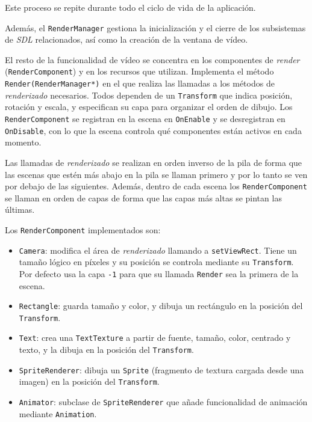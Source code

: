 Este proceso se repite durante todo el ciclo de vida de la aplicación.

\medskip

Además, el \texttt{RenderManager} gestiona la inicialización y el cierre de los subsistemas de \textit{SDL} relacionados, así como la creación de la ventana de vídeo.

\medskip

El resto de la funcionalidad de vídeo se concentra en los componentes de \textit{render} (\texttt{RenderComponent}) y en los recursos que utilizan. Implementa el método \texttt{Render(RenderManager*)} en el que realiza las llamadas a los métodos de \textit{renderizado} necesarios. Todos dependen de un \texttt{Transform} que indica posición, rotación y escala, y especifican su capa para organizar el orden de dibujo. Los \texttt{RenderComponent} se registran en la escena en \texttt{OnEnable} y se desregistran en \texttt{OnDisable}, con lo que la escena controla qué componentes están activos en cada momento.  

\medskip

Las llamadas de \textit{renderizado} se realizan en orden inverso de la pila de forma que las escenas que estén más abajo en la pila se llaman primero y por lo tanto se ven por debajo de las siguientes. Además, dentro de cada escena los \texttt{RenderComponent} se llaman en orden de capas de forma que las capas más altas se pintan las últimas.

\medskip

Los \texttt{RenderComponent} implementados son: 

\begin{itemize}
	\item \texttt{Camera}: modifica el área de \textit{renderizado} llamando a \texttt{setViewRect}. Tiene un tamaño lógico en píxeles y su posición se controla mediante su \texttt{Transform}. Por defecto usa la capa \texttt{-1} para que su llamada \texttt{Render} sea la primera de la escena.
	\item \texttt{Rectangle}: guarda tamaño y color, y dibuja un rectángulo en la posición del \texttt{Transform}. 
	\item \texttt{Text}: crea una \texttt{TextTexture} a partir de fuente, tamaño, color, centrado y texto, y la dibuja en la posición del \texttt{Transform}.
	\item \texttt{SpriteRenderer}: dibuja un \texttt{Sprite} (fragmento de textura cargada desde una imagen) en la posición del \texttt{Transform}. 
	\item \texttt{Animator}: subclase de \texttt{SpriteRenderer} que añade funcionalidad de animación mediante \texttt{Animation}. 
\end{itemize}

